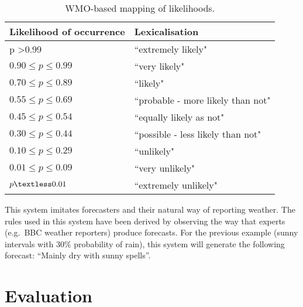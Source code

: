 \documentclass[11pt]{article}
\begin{document}
\begin{table}
\small
\centering
\begin{tabular}{|p{2.5cm}|l|}
\hline \bf Likelihood of occurrence & \bf Lexicalisation \\ \hline \hline
p \textgreater 0.99 & ``extremely likely" \\
$0.90  \leq p \leq 0.99$  & ``very likely" \\
$0.70  \leq p \leq 0.89$  & ``likely" \\
$0.55  \leq p \leq 0.69$  & ``probable - more likely than not" \\
$0.45  \leq p \leq 0.54$  & ``equally likely as not" \\
$0.30  \leq p \leq 0.44$  & ``possible - less likely than not" \\
$0.10  \leq p \leq 0.29$  & ``unlikely" \\
$0.01 \leq p \leq 0.09$  & ``very unlikely" \\
$p \textless 0.01 $  & ``extremely unlikely" \\
\hline
\end{tabular}
\caption{\label{probs} WMO-based mapping of likelihoods.}
\end{table}

 This system imitates forecasters and their
natural way of reporting weather. The rules used in this system have been derived by observing the way that experts (e.g.\ BBC weather reporters) produce forecasts. For the previous example (sunny intervals with 30\% probability of rain), this system will generate the following forecast: ``Mainly dry with sunny spells''.

\section{Evaluation} \label{evaluation}
\end{document}
